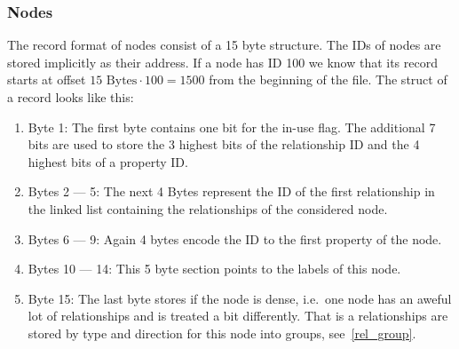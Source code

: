 \documentclass[a4paper,10pt]{article}
\begin{document}
        \subsubsection{Nodes}
            The record format of nodes consist of a 15 byte structure.
            The IDs of nodes are stored implicitly as their address.
            If a node has ID 100 we know that its record starts at offset $15 \text{ Bytes} \cdot 100 = 1500$ from the beginning of the file.
            The struct of a record looks like this:
            \begin{enumerate}
                \item Byte 1: The first byte contains one bit for the in-use flag. 
                    The additional 7 bits are used to store the 3 highest bits of the relationship ID and the 4 highest bits of a property ID\@.
                \item Bytes 2 --- 5: The next 4 Bytes represent the ID of the first relationship in the linked list containing the relationships of the considered node.
                \item Bytes 6 --- 9: Again 4 bytes encode the ID to the first property of the node.
                \item Bytes 10 --- 14: This 5 byte section points to the labels of this node.
                \item Byte 15: The last byte stores if the node is dense, i.e.\ one node has an aweful lot of relationships and is treated a bit differently.
                    That is a relationships are stored by type and direction for this node into groups, see~\ref{rel_group}.
            \end{enumerate}
        
\end{document}

